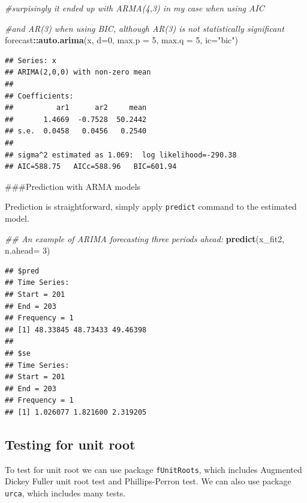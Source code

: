 \documentclass[]{book}
\newenvironment{Shaded}{\begin{snugshade}}{\end{snugshade}}
\newcommand{\CommentTok}[1]{\textcolor[rgb]{0.56,0.35,0.01}{\textit{#1}}}
\newcommand{\DataTypeTok}[1]{\textcolor[rgb]{0.13,0.29,0.53}{#1}}
\newcommand{\DecValTok}[1]{\textcolor[rgb]{0.00,0.00,0.81}{#1}}
\newcommand{\KeywordTok}[1]{\textcolor[rgb]{0.13,0.29,0.53}{\textbf{#1}}}
\newcommand{\NormalTok}[1]{#1}
\newcommand{\OperatorTok}[1]{\textcolor[rgb]{0.81,0.36,0.00}{\textbf{#1}}}
\newcommand{\StringTok}[1]{\textcolor[rgb]{0.31,0.60,0.02}{#1}}
\begin{document}
\begin{Shaded}
\begin{Highlighting}[]
\CommentTok{#surpisingly it ended up with ARMA(4,3) in my case when using AIC}

\CommentTok{#and AR(3) when using BIC, although AR(3) is not statistically significant}
\NormalTok{forecast}\OperatorTok{::}\KeywordTok{auto.arima}\NormalTok{(x, }\DataTypeTok{d=}\DecValTok{0}\NormalTok{, }\DataTypeTok{max.p =} \DecValTok{5}\NormalTok{, }\DataTypeTok{max.q =} \DecValTok{5}\NormalTok{, }\DataTypeTok{ic=}\StringTok{"bic"}\NormalTok{)}
\end{Highlighting}
\end{Shaded}

\begin{verbatim}
## Series: x 
## ARIMA(2,0,0) with non-zero mean 
## 
## Coefficients:
##          ar1      ar2     mean
##       1.4669  -0.7528  50.2442
## s.e.  0.0458   0.0456   0.2540
## 
## sigma^2 estimated as 1.069:  log likelihood=-290.38
## AIC=588.75   AICc=588.96   BIC=601.94
\end{verbatim}

\#\#\#Prediction with ARMA models

Prediction is straightforward, simply apply \texttt{predict} command to the estimated model.

\begin{Shaded}
\begin{Highlighting}[]
\CommentTok{## An example of ARIMA forecasting three periods ahead:}
\KeywordTok{predict}\NormalTok{(x_fit2, }\DataTypeTok{n.ahead=} \DecValTok{3}\NormalTok{)}
\end{Highlighting}
\end{Shaded}

\begin{verbatim}
## $pred
## Time Series:
## Start = 201 
## End = 203 
## Frequency = 1 
## [1] 48.33845 48.73433 49.46398
## 
## $se
## Time Series:
## Start = 201 
## End = 203 
## Frequency = 1 
## [1] 1.026077 1.821600 2.319205
\end{verbatim}

\hypertarget{testing-for-unit-root}{%
\subsection{Testing for unit root}\label{testing-for-unit-root}}

To test for unit root we can use package \texttt{fUnitRoots}, which includes Augmented Dickey Fuller unit root test and Phillips-Perron test. We can also use package \texttt{urca}, which includes many tests.
\end{document}
